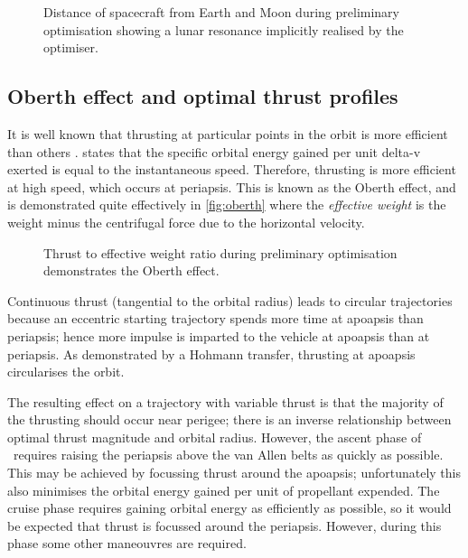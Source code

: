 \begin{figure}
\caption{Distance of spacecraft from Earth and Moon during preliminary optimisation showing a lunar resonance implicitly realised by the optimiser.} \label{fig:Lunar-resonance2}
\centering
\def\svgwidth{\figurewidth}

\end{figure}




\subsection{Oberth effect and optimal thrust profiles} \label{sub:Oberth}

It is well known that thrusting at particular points in the orbit is more efficient than others \parencite{Kemble2006}. \textcite{Oberth1923} states that the specific orbital energy gained per unit delta-v exerted is equal to the instantaneous speed. Therefore, thrusting is more efficient at high speed, which occurs at periapsis. This is known as the Oberth effect, and is demonstrated quite effectively in \autoref{fig:oberth} where the \emph{effective weight} is the weight minus the centrifugal force due to the horizontal velocity.

\begin{figure}
\caption{Thrust to effective weight ratio during preliminary optimisation demonstrates the Oberth effect.} \label{fig:oberth}
\centering
\def\svgwidth{\figurewidth}

\end{figure}

Continuous thrust (tangential to the orbital radius) leads to circular trajectories because an eccentric starting trajectory spends more time at apoapsis than periapsis; hence more impulse is imparted to the vehicle at apoapsis than at periapsis. As demonstrated by a Hohmann transfer, thrusting at apoapsis circularises the orbit.

The resulting effect on a trajectory with variable thrust is that the majority of the thrusting should occur near perigee; there is an inverse relationship between optimal thrust magnitude and orbital radius. However, the ascent phase of \BW\ requires raising the periapsis above the van Allen belts as quickly as possible. This may be achieved by focussing thrust around the apoapsis; unfortunately this also minimises the orbital energy gained per unit of propellant expended. The cruise phase requires gaining orbital energy as efficiently as possible, so it would be expected that thrust is focussed around the periapsis. However, during this phase some other maneouvres are required. 

